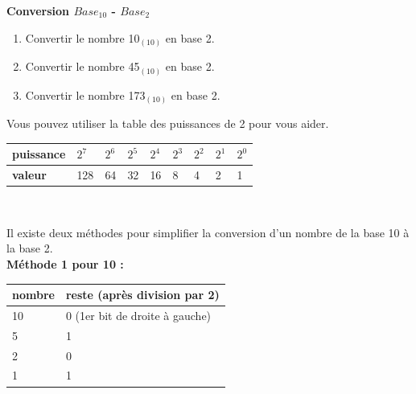 \begin{Exercice}[5 minutes]  \textbf{Conversion $Base_{10}$ - $Base_2$}\\
    \begin{enumerate}
        \item Convertir le nombre 10$_{(10)}$ en base 2.
        \item Convertir le nombre 45$_{(10)}$ en base 2.
        \item Convertir le nombre 173$_{(10)}$ en base 2.
    \end{enumerate}

    \begin{conseil}
        Vous pouvez utiliser la table des puissances de 2 pour vous aider. \\
        
        \begin{tabular}{| C{0.15\textwidth} | *{8}{C{0.065\textwidth}|}}
            \hline
            \textbf{puissance} & $2^{7}$ & $2^{6}$ & $2^{5}$ & $2^{4}$ & $2^{3}$ & $2^{2}$ & $2^{1}$ & $2^{0}$ \\ [0.5ex] 
            \hline
            \textbf{valeur} & 128 & 64 & 32 & 16 & 8 & 4 & 2 & 1 \\ [0.5ex] 
            \hline
        \end{tabular} \\
        
    \end{conseil}

    \begin{solution}
    Il existe deux méthodes pour simplifier la conversion d'un nombre de la base 10 à la base 2.  \\
        
    \textbf{Méthode 1 pour 10 :}
        \medskip
        \begin{tabular}{| C{0.19\textwidth} | C{0.55\textwidth} |} 
        \hline
        \textbf{nombre} & \textbf{reste (après division par 2)}\\ [0.5ex]
         &  0 (1er bit de droite à gauche) \\ [0.5ex] 
         & 1 \\ [0.5ex] 
         & 0 \\ [0.5ex] 
         & 1 \\ [0.5ex] 
        \hline
        \end{tabular}


\end{solution}
\end{Exercice}
